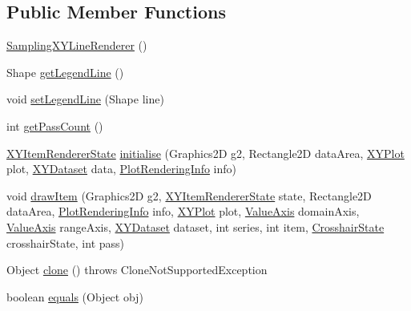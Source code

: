 \subsection*{Public Member Functions}
\begin{DoxyCompactItemize}
\item 
\mbox{\hyperlink{classorg_1_1jfree_1_1chart_1_1renderer_1_1xy_1_1_sampling_x_y_line_renderer_a02048ebf97d548039ade98343463dffc}{Sampling\+X\+Y\+Line\+Renderer}} ()
\item 
Shape \mbox{\hyperlink{classorg_1_1jfree_1_1chart_1_1renderer_1_1xy_1_1_sampling_x_y_line_renderer_a10b79f154b6f60fa5b48ddfc64405e03}{get\+Legend\+Line}} ()
\item 
void \mbox{\hyperlink{classorg_1_1jfree_1_1chart_1_1renderer_1_1xy_1_1_sampling_x_y_line_renderer_a14fdb28396558b7d0c00cae5af9ea755}{set\+Legend\+Line}} (Shape line)
\item 
int \mbox{\hyperlink{classorg_1_1jfree_1_1chart_1_1renderer_1_1xy_1_1_sampling_x_y_line_renderer_a21ee33734eeee27f54d8cdb0b9c51e11}{get\+Pass\+Count}} ()
\item 
\mbox{\hyperlink{classorg_1_1jfree_1_1chart_1_1renderer_1_1xy_1_1_x_y_item_renderer_state}{X\+Y\+Item\+Renderer\+State}} \mbox{\hyperlink{classorg_1_1jfree_1_1chart_1_1renderer_1_1xy_1_1_sampling_x_y_line_renderer_a623879d6b839709aec1a7e112090816a}{initialise}} (Graphics2D g2, Rectangle2D data\+Area, \mbox{\hyperlink{classorg_1_1jfree_1_1chart_1_1plot_1_1_x_y_plot}{X\+Y\+Plot}} plot, \mbox{\hyperlink{interfaceorg_1_1jfree_1_1data_1_1xy_1_1_x_y_dataset}{X\+Y\+Dataset}} data, \mbox{\hyperlink{classorg_1_1jfree_1_1chart_1_1plot_1_1_plot_rendering_info}{Plot\+Rendering\+Info}} info)
\item 
void \mbox{\hyperlink{classorg_1_1jfree_1_1chart_1_1renderer_1_1xy_1_1_sampling_x_y_line_renderer_ac3d7b9a5e589a98508f2907005524f5b}{draw\+Item}} (Graphics2D g2, \mbox{\hyperlink{classorg_1_1jfree_1_1chart_1_1renderer_1_1xy_1_1_x_y_item_renderer_state}{X\+Y\+Item\+Renderer\+State}} state, Rectangle2D data\+Area, \mbox{\hyperlink{classorg_1_1jfree_1_1chart_1_1plot_1_1_plot_rendering_info}{Plot\+Rendering\+Info}} info, \mbox{\hyperlink{classorg_1_1jfree_1_1chart_1_1plot_1_1_x_y_plot}{X\+Y\+Plot}} plot, \mbox{\hyperlink{classorg_1_1jfree_1_1chart_1_1axis_1_1_value_axis}{Value\+Axis}} domain\+Axis, \mbox{\hyperlink{classorg_1_1jfree_1_1chart_1_1axis_1_1_value_axis}{Value\+Axis}} range\+Axis, \mbox{\hyperlink{interfaceorg_1_1jfree_1_1data_1_1xy_1_1_x_y_dataset}{X\+Y\+Dataset}} dataset, int series, int item, \mbox{\hyperlink{classorg_1_1jfree_1_1chart_1_1plot_1_1_crosshair_state}{Crosshair\+State}} crosshair\+State, int pass)
\item 
Object \mbox{\hyperlink{classorg_1_1jfree_1_1chart_1_1renderer_1_1xy_1_1_sampling_x_y_line_renderer_afe06934abdfb234ec5a2e30cc6ebed15}{clone}} ()  throws Clone\+Not\+Supported\+Exception 
\item 
boolean \mbox{\hyperlink{classorg_1_1jfree_1_1chart_1_1renderer_1_1xy_1_1_sampling_x_y_line_renderer_a548d0be1dc889073dfd97413764d7a9d}{equals}} (Object obj)
\end{DoxyCompactItemize}
